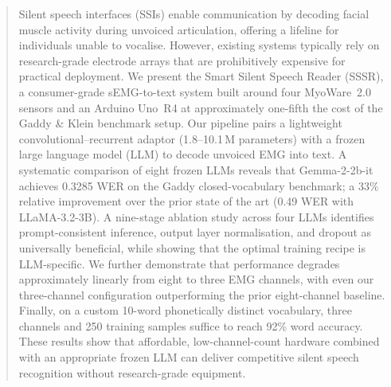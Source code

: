\documentclass[a4paper,12pt]{article}
\begin{document}
\begin{abstract}
Silent speech interfaces (SSIs) enable communication by decoding facial muscle activity during unvoiced articulation, offering a lifeline for individuals unable to vocalise. However, existing systems typically rely on research-grade electrode arrays that are prohibitively expensive for practical deployment. We present the Smart Silent Speech Reader (SSSR), a consumer-grade sEMG-to-text system built around four MyoWare~2.0 sensors and an Arduino Uno~R4 at approximately one-fifth the cost of the Gaddy \& Klein benchmark setup. Our pipeline pairs a lightweight convolutional--recurrent adaptor (1.8--10.1\,M parameters) with a frozen large language model (LLM) to decode unvoiced EMG into text. A systematic comparison of eight frozen LLMs reveals that Gemma-2-2b-it achieves 0.3285 WER on the Gaddy closed-vocabulary benchmark; a 33\% relative improvement over the prior state of the art (0.49 WER with LLaMA-3.2-3B). A nine-stage ablation study across four LLMs identifies prompt-consistent inference, output layer normalisation, and dropout as universally beneficial, while showing that the optimal training recipe is LLM-specific. We further demonstrate that performance degrades approximately linearly from eight to three EMG channels, with even our three-channel configuration outperforming the prior eight-channel baseline. Finally, on a custom 10-word phonetically distinct vocabulary, three channels and 250 training samples suffice to reach 92\% word accuracy. These results show that affordable, low-channel-count hardware combined with an appropriate frozen LLM can deliver competitive silent speech recognition without research-grade equipment.
\end{abstract}

\pagebreak
\tableofcontents
\pagebreak








\clearpage


\end{document}
